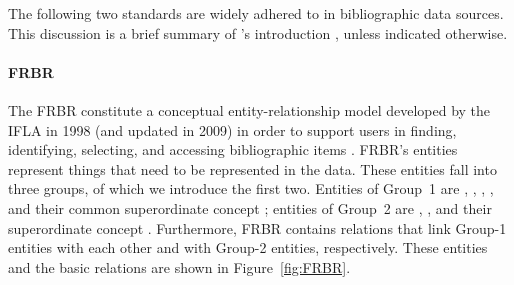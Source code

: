 The following two standards are widely adhered to in bibliographic data sources.
This discussion
is a brief summary of \citeauthor{Wiesenmueller2015}'s introduction
\autocite*[§§2,3]{Wiesenmueller2015},
unless indicated otherwise.

\paragraph{FRBR}

The \gls{FRBR} constitute a conceptual entity-relationship model
developed by the \gls{IFLA} in 1998 (and updated in 2009)
in order to support users in finding, identifying, selecting, and accessing
bibliographic items \autocite[p.17]{Wiesenmueller2015}.
\gls{FRBR}'s entities represent things that need to be represented in the data.
These entities fall into three groups, of which we introduce the first
two.
Entities of Group~1 are , , , ,
and their common superordinate concept ;
entities of Group~2 are , ,
and their superordinate concept .
Furthermore, \gls{FRBR} contains relations that link Group-1 entities with each other
and with Group-2 entities, respectively.
These entities and the basic relations are shown in Figure~\ref{fig:FRBR}.

